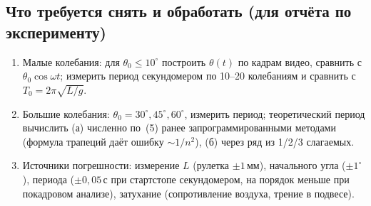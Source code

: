 \documentclass[12pt,a4paper]{article}
\begin{document}
\subsection*{Что требуется снять и обработать (для отчёта по эксперименту)}

\begin{enumerate}
  \item Малые колебания: для $\theta_0\le 10^\circ$ построить
  $\theta(t)$ по кадрам видео, сравнить с $\theta_0\cos\omega t$;
  измерить период секундомером по 10--20 колебаниям и сравнить с
  $T_0=2\pi\sqrt{L/g}$.
  \item Большие колебания: $\theta_0=30^\circ,45^\circ,60^\circ$, измерить
  период; теоретический период вычислить (а) численно по~(5)
  ранее запрограммированными методами (формула трапеций даёт ошибку
  $\sim 1/n^2$), (б) через ряд из 1/2/3 слагаемых.
  \item Источники погрешности: измерение $L$ (рулетка $\pm 1$\,мм),
  начального угла ($\pm 1^\circ$), периода ($\pm 0{,}05$\,с при
  стартстопе секундомером, на порядок меньше при покадровом анализе),
  затухание (сопротивление воздуха, трение в подвесе).
\end{enumerate}
\end{document}
